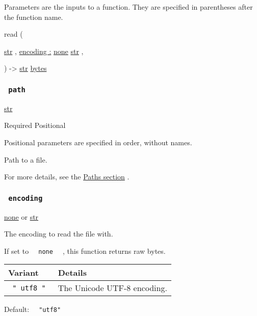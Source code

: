 \label{parameters-tooltip}
Parameters are the inputs to a function. They are specified in
parentheses after the function name.

{ read } (

{ \href{/docs/reference/foundations/str/}{str} , } {
\hyperref[parameters-encoding]{encoding :}
\href{/docs/reference/foundations/none/}{none}
\href{/docs/reference/foundations/str/}{str} , }

) -\textgreater{} \href{/docs/reference/foundations/str/}{str}
\href{/docs/reference/foundations/bytes/}{bytes}

\subsubsection{\texorpdfstring{\texttt{\ path\ }}{ path }}\label{parameters-path}

\href{/docs/reference/foundations/str/}{str}

{Required} {{ Positional }}

\label{parameters-path-positional-tooltip}
Positional parameters are specified in order, without names.

Path to a file.

For more details, see the \href{/docs/reference/syntax/\#paths}{Paths
section} .

\subsubsection{\texorpdfstring{\texttt{\ encoding\ }}{ encoding }}\label{parameters-encoding}

\href{/docs/reference/foundations/none/}{none} {or}
\href{/docs/reference/foundations/str/}{str}

The encoding to read the file with.

If set to \texttt{\ }{\texttt{\ none\ }}\texttt{\ } , this function
returns raw bytes.

\begin{longtable}[]{@{}ll@{}}
\toprule\noalign{}
Variant & Details \\
\midrule\noalign{}
\endhead
\bottomrule\noalign{}
\endlastfoot
\texttt{\ "\ utf8\ "\ } & The Unicode UTF-8 encoding. \\
\end{longtable}

Default: \texttt{\ }{\texttt{\ "utf8"\ }}\texttt{\ }

\href{/docs/reference/data-loading/json/}{\pandocbounded{}}

